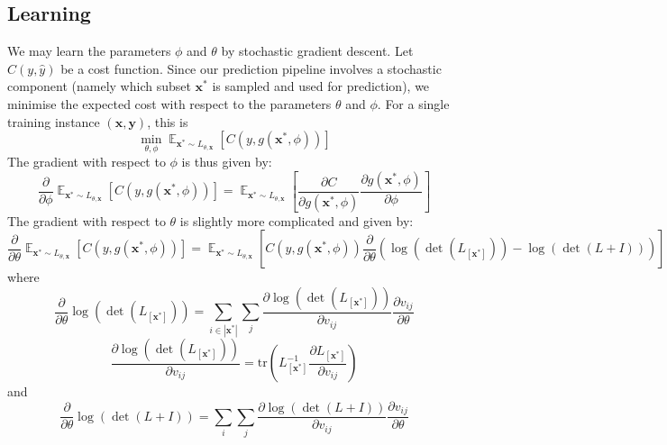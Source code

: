 \documentclass[12pt, oneside]{article}   	%
\begin{document}
\subsection*{Learning}
We may learn the parameters $\phi$ and $\theta$ by stochastic gradient descent. Let $C(y, \hat{y})$ be a cost function. Since our prediction pipeline involves a stochastic component (namely which subset $\textbf{x}^*$ is sampled and used for prediction), we minimise the expected cost with respect to the parameters $\theta$ and $\phi$. For a single training instance $(\textbf{x},\textbf{y})$, this is 
\begin{equation}
\min_{\theta, \phi}  \mathop{\mathbb{E}}_{\textbf{x}^* \sim L_{\theta,\textbf{x}}}[C(y, g(\textbf{x}^*, \phi))]
\end{equation}
%
The gradient with respect to $\phi$ is thus given by: 
\begin{equation}
\frac{\partial}{\partial \phi} \mathop{\mathbb{E}}_{\textbf{x}^* \sim L_{\theta,\textbf{x}}}
	[C(y, g(\textbf{x}^*, \phi))] 	
	= \mathop{\mathbb{E}}_{\textbf{x}^* \sim L_{\theta,\textbf{x}}}
	[\frac{\partial C}{\partial g(\textbf{x}^*,\phi)}\frac{\partial g(\textbf{x}^*,\phi)}{\partial \phi}
	]
\end{equation}
%
The gradient with respect to $\theta$ is slightly more complicated and given by:
\begin{equation}
\frac{\partial}{\partial \theta} \mathop{\mathbb{E}}_{\textbf{x}^* \sim L_{\theta,\textbf{x}}}
	[C(y, g(\textbf{x}^*, \phi))] 	
	= \mathop{\mathbb{E}}_{\textbf{x}^* \sim L_{\theta,\textbf{x}}}
	[C(y, g(\textbf{x}^*, \phi)) 
	\frac{\partial}{\partial \theta}(\log(\det(L_{[\textbf{x}^*]}))-\log(\det(L+I)))
	]
\end{equation}
where
\begin{equation}
\frac{\partial}{\partial \theta}\log(\det(L_{[\textbf{x}^*]})) = \sum_{i \in |\textbf{x}^*|}\sum_{j} 
	\frac{\partial \log(\det(L_{[\textbf{x}^*]}))}{\partial v_{ij}} \frac{\partial v_{ij}}{\partial \theta}
\end{equation}
\begin{equation}
\label{low-fact-1}
	\frac{\partial \log(\det(L_{[\textbf{x}^*]}))}{\partial v_{ij}} = \mathrm{tr}\left(L_{[\textbf{x}^*]}^{-1}
	\frac{\partial L_{[\textbf{x}^*]}}{\partial v_{ij}}\right)
\end{equation}
and 
\begin{equation}
\frac{\partial}{\partial \theta}\log(\det(L+I)) = \sum_{i}\sum_{j} 
	\frac{\partial \log(\det(L+I))}{\partial v_{ij}} \frac{\partial v_{ij}}{\partial \theta}
\end{equation}
\end{document}
